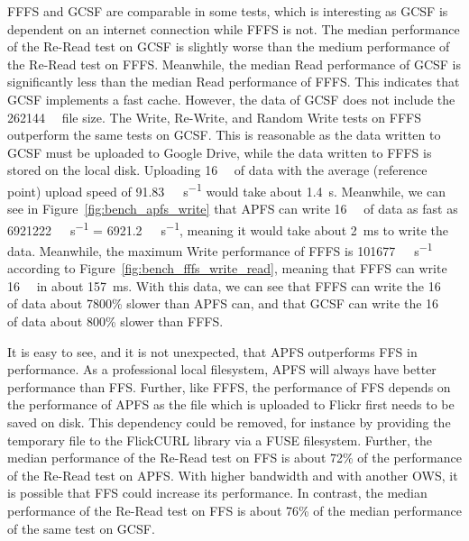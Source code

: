 \gls{FFFS} and \gls{GCSF} are comparable in some tests, which is interesting as \gls{GCSF} is dependent on an internet connection while \gls{FFFS} is not. The median performance of the \mbox{Re-Read} test on \gls{GCSF} is slightly worse than the medium performance of the \mbox{Re-Read} test on \gls{FFFS}. Meanwhile, the median Read performance of \gls{GCSF} is significantly less than the median Read performance of \gls{FFFS}. This indicates that \gls{GCSF} implements a fast cache. However, the data of \gls{GCSF} does not include the \SI{262144}{\kilo\byte} file size. The Write, \mbox{Re-Write}, and Random Write tests on \gls{FFFS} outperform the same tests on \gls{GCSF}. This is reasonable as the data written to \gls{GCSF} must be uploaded to Google Drive, while the data written to \gls{FFFS} is stored on the local disk. Uploading \SI{16}{\mega\byte} of data with the average (reference point) upload speed of \SI[per-mode = symbol]{91.83}{\mega\bit\per\second} would take about \SI{1.4}{\second}. Meanwhile, we can see in Figure~\ref{fig:bench_apfs_write} that \gls{APFS} can write \SI{16}{\mega\byte} of data as fast as \SI[per-mode = symbol]{6921222}{\kilo\byte\per\second} = \SI[per-mode = symbol]{6921.2}{\mega\byte\per\second}, meaning it would take about \SI{2}{\milli\second} to write the data. Meanwhile, the maximum Write performance of \gls{FFFS} is \SI[per-mode = symbol]{101677}{\kilo\byte\per\second} according to Figure~\ref{fig:bench_fffs_write_read}, meaning that \gls{FFFS} can write \SI{16}{\mega\byte} in about \SI{157}{\milli\second}. With this data, we can see that \gls{FFFS} can write the \SI{16}{\mega\byte} of data about 7800\% slower than \gls{APFS} can, and that \gls{GCSF} can write the \SI{16}{\mega\byte} of data about 800\% slower than \gls{FFFS}. 

It is easy to see, and it is not unexpected, that \gls{APFS} outperforms \gls{FFS} in performance. As a professional local filesystem, \gls{APFS} will always have better performance than FFS. Further, like \gls{FFFS}, the performance of \gls{FFS} depends on the performance of \gls{APFS} as the file which is uploaded to Flickr first needs to be saved on disk. This dependency could be removed, for instance by providing the temporary file to the FlickCURL library via a \gls{FUSE} filesystem. Further, the median performance of the \mbox{Re-Read} test on \gls{FFS} is about 72\% of the performance of the \mbox{Re-Read} test on \gls{APFS}. With higher bandwidth and with another \gls{OWS}, it is possible that \gls{FFS} could increase its performance. In contrast, the median performance of the \mbox{Re-Read} test on \gls{FFS} is about 76\% of the median performance of the same test on \gls{GCSF}.